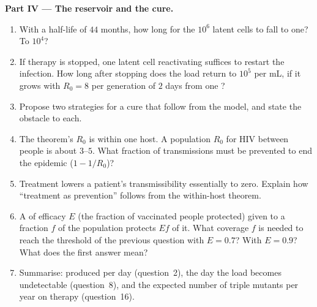 \begin{problem}
\medskip
\noindent\textbf{Part IV --- The reservoir and the cure.}
\begin{enumerate}[resume]
  \item With a half-life of $44$ months, how long for the $10^{6}$
        latent cells to fall to one? To $10^{4}$?
  \item If therapy is stopped, one latent cell reactivating suffices to
        restart the infection. How long after stopping does the load
        return to $10^{5}$ per mL, if it grows with $R_{0} = 8$ per
        generation of $2$ days from one ?
  \item Propose two strategies for a cure that follow from the model,
        and state the obstacle to each.
  \item The theorem's $R_{0}$ is within one host. A population $R_{0}$
        for HIV between people is about $3$--$5$. What fraction of
        transmissions must be prevented to end the epidemic
        ($1 - 1/R_{0}$)?
  \item Treatment lowers a patient's transmissibility essentially to
        zero. Explain how ``treatment as prevention'' follows from the
        within-host theorem.
  \item A  of efficacy $E$ (the fraction of vaccinated people
        protected) given to a fraction $f$ of the population protects
        $Ef$ of it. What coverage $f$ is needed to reach the threshold
        of the previous question with $E = 0.7$? With $E = 0.9$? What
        does the first answer mean?
  \item Summarise:  produced per day (question~2), the day the
        load becomes undetectable (question~8), and the expected number
        of triple mutants per year on therapy (question~16).
\end{enumerate}
\end{problem}
